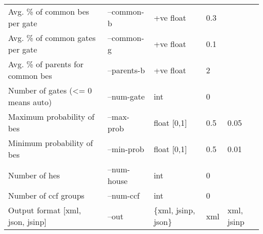 \begin{longtable}{@{}lllll@{}}
Avg. \% of common \acrshort{be}s per gate     & --common-b  & +ve float       & 0.3     &             \\
Avg. \% of common gates per gate            & --common-g  & +ve float       & 0.1     &             \\
Avg. \% of parents for common \acrshort{be}s  & --parents-b & +ve float       & 2       &             \\
Number of gates (\textless{}= 0 means auto) & --num-gate  & int             & 0       &             \\
Maximum probability of \acrshort{be}s         & --max-prob & float {[}0,1{]} & 0.5     & 0.05        \\
Minimum probability of \acrshort{be}s         & --min-prob  & float {[}0,1{]} & 0.5     & 0.01        \\
Number of \acrfull{he}s                     & --num-house & int             & 0       &             \\
Number of \acrshort{ccf} groups                        & --num-ccf   & int             & 0       &             \\
Output format {[}\acrshort{xml}, \acrshort{json}, \acrshort{jsinp}{]}               & --out       & \{xml, jsinp, json\}   & xml     & xml, jsinp   \\* \bottomrule
\end{longtable}